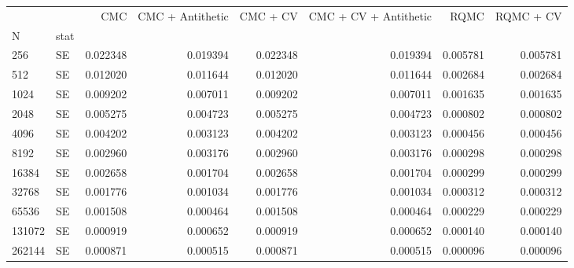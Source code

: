 \begin{tabular}{llrrrrrr}
\toprule
 &  & CMC & CMC + Antithetic & CMC + CV & CMC + CV + Antithetic & RQMC & RQMC + CV \\
N & stat &  &  &  &  &  &  \\
\midrule
256 & SE & 0.022348 & 0.019394 & 0.022348 & 0.019394 & 0.005781 & 0.005781 \\
\cline{1-8}
512 & SE & 0.012020 & 0.011644 & 0.012020 & 0.011644 & 0.002684 & 0.002684 \\
\cline{1-8}
1024 & SE & 0.009202 & 0.007011 & 0.009202 & 0.007011 & 0.001635 & 0.001635 \\
\cline{1-8}
2048 & SE & 0.005275 & 0.004723 & 0.005275 & 0.004723 & 0.000802 & 0.000802 \\
\cline{1-8}
4096 & SE & 0.004202 & 0.003123 & 0.004202 & 0.003123 & 0.000456 & 0.000456 \\
\cline{1-8}
8192 & SE & 0.002960 & 0.003176 & 0.002960 & 0.003176 & 0.000298 & 0.000298 \\
\cline{1-8}
16384 & SE & 0.002658 & 0.001704 & 0.002658 & 0.001704 & 0.000299 & 0.000299 \\
\cline{1-8}
32768 & SE & 0.001776 & 0.001034 & 0.001776 & 0.001034 & 0.000312 & 0.000312 \\
\cline{1-8}
65536 & SE & 0.001508 & 0.000464 & 0.001508 & 0.000464 & 0.000229 & 0.000229 \\
\cline{1-8}
131072 & SE & 0.000919 & 0.000652 & 0.000919 & 0.000652 & 0.000140 & 0.000140 \\
\cline{1-8}
262144 & SE & 0.000871 & 0.000515 & 0.000871 & 0.000515 & 0.000096 & 0.000096 \\
\cline{1-8}
\bottomrule
\end{tabular}
